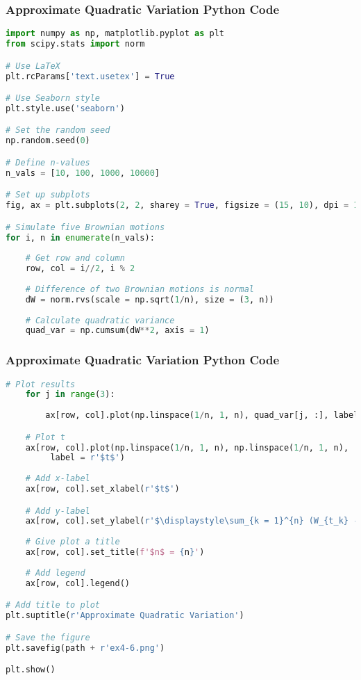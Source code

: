 \documentclass{beamer}
\begin{document}
\begin{frame}[fragile]
\frametitle{Approximate Quadratic Variation Python Code}

\begin{lstlisting}[language=Python]
import numpy as np, matplotlib.pyplot as plt
from scipy.stats import norm

# Use LaTeX
plt.rcParams['text.usetex'] = True

# Use Seaborn style
plt.style.use('seaborn')

# Set the random seed
np.random.seed(0)

# Define n-values
n_vals = [10, 100, 1000, 10000]

# Set up subplots
fig, ax = plt.subplots(2, 2, sharey = True, figsize = (15, 10), dpi = 125)

# Simulate five Brownian motions
for i, n in enumerate(n_vals):
    
    # Get row and column
    row, col = i//2, i % 2
    
    # Difference of two Brownian motions is normal
    dW = norm.rvs(scale = np.sqrt(1/n), size = (3, n))
    
    # Calculate quadratic variance
    quad_var = np.cumsum(dW**2, axis = 1)

\end{lstlisting}
\end{frame}

\begin{frame}[fragile]
\frametitle{Approximate Quadratic Variation Python Code}

\begin{lstlisting}[language=Python]    
    # Plot results
    for j in range(3):
        
        ax[row, col].plot(np.linspace(1/n, 1, n), quad_var[j, :], label = f'Brownian Motion {j}')

    # Plot t
    ax[row, col].plot(np.linspace(1/n, 1, n), np.linspace(1/n, 1, n), 
         label = r'$t$')
    
    # Add x-label
    ax[row, col].set_xlabel(r'$t$')

    # Add y-label
    ax[row, col].set_ylabel(r'$\displaystyle\sum_{k = 1}^{n} (W_{t_k} - W_{t_{k - 1}})^2$')
    
    # Give plot a title
    ax[row, col].set_title(f'$n$ = {n}')
    
    # Add legend
    ax[row, col].legend()

# Add title to plot
plt.suptitle(r'Approximate Quadratic Variation')

# Save the figure
plt.savefig(path + r'ex4-6.png')

plt.show()
\end{lstlisting}
\end{frame}
\end{document}
